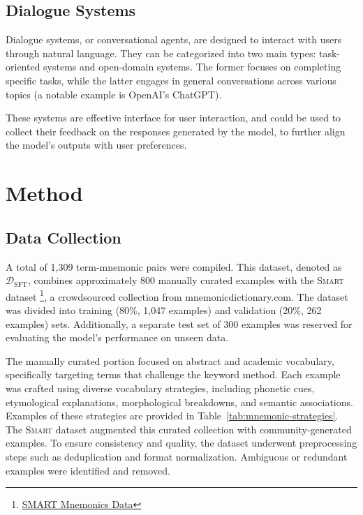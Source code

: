 \documentclass{article}
\newcounter{para}
\begin{document}
\subsection{Dialogue Systems} \label{sec:dialogue}

Dialogue systems, or conversational agents, are designed to interact with users through natural language. They can be categorized into two main types: task-oriented systems and open-domain systems. The former focuses on completing specific tasks, while the latter engages in general conversations across various topics (a notable example is OpenAI's ChatGPT).

These systems are effective interface for user interaction, and could be used to collect their feedback on the responses generated by the model, to further align the model's outputs with user preferences.

\section{Method} \label{sec:method}

\subsection{Data Collection} \label{sec:met-data}

A total of 1,309 term-mnemonic pairs were compiled. This dataset, denoted as \( \mathcal{D}_{\text{SFT}} \), combines approximately 800 manually curated examples with the \textsc{Smart} dataset \footnote{\href{https://huggingface.co/datasets/nbalepur/Mnemonic_SFT}{SMART Mnemonics Data}}, a crowdsourced collection from mnemonicdictionary.com. The dataset was divided into training (80\%, 1,047 examples) and validation (20\%, 262 examples) sets. Additionally, a separate test set of 300 examples was reserved for evaluating the model's performance on unseen data.

The manually curated portion focused on abstract and academic vocabulary, specifically targeting terms that challenge the keyword method. Each example was crafted using diverse vocabulary strategies, including phonetic cues, etymological explanations, morphological breakdowns, and semantic associations. Examples of these strategies are provided in Table~\ref{tab:mnemonic-strategies}. The \textsc{Smart} dataset augmented this curated collection with community-generated examples. To ensure consistency and quality, the dataset underwent preprocessing steps such as deduplication and format normalization. Ambiguous or redundant examples were identified and removed.
\end{document}
